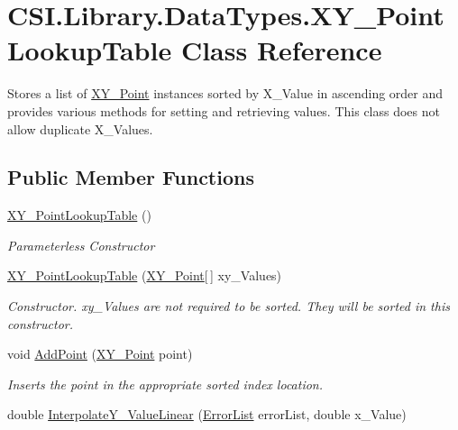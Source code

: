 \hypertarget{class_c_s_i_1_1_library_1_1_data_types_1_1_x_y___point_lookup_table}{}\section{C\+S\+I.\+Library.\+Data\+Types.\+X\+Y\+\_\+\+Point\+Lookup\+Table Class Reference}
\label{class_c_s_i_1_1_library_1_1_data_types_1_1_x_y___point_lookup_table}


Stores a list of \mbox{\hyperlink{struct_c_s_i_1_1_library_1_1_data_types_1_1_x_y___point}{X\+Y\+\_\+\+Point}} instances sorted by X\+\_\+\+Value in ascending order and provides various methods for setting and retrieving values. This class does not allow duplicate X\+\_\+\+Values.  


\subsection*{Public Member Functions}
\begin{DoxyCompactItemize}
\item 
\mbox{\hyperlink{class_c_s_i_1_1_library_1_1_data_types_1_1_x_y___point_lookup_table_a3cb5167efae35b3817028ee668aafa58}{X\+Y\+\_\+\+Point\+Lookup\+Table}} ()
\begin{DoxyCompactList}\small\item\em Parameterless Constructor \end{DoxyCompactList}\item 
\mbox{\hyperlink{class_c_s_i_1_1_library_1_1_data_types_1_1_x_y___point_lookup_table_aeac36bfc5b7f8b0a6fcb593a94536f2e}{X\+Y\+\_\+\+Point\+Lookup\+Table}} (\mbox{\hyperlink{struct_c_s_i_1_1_library_1_1_data_types_1_1_x_y___point}{X\+Y\+\_\+\+Point}}\mbox{[}$\,$\mbox{]} xy\+\_\+\+Values)
\begin{DoxyCompactList}\small\item\em Constructor. xy\+\_\+\+Values are not required to be sorted. They will be sorted in this constructor. \end{DoxyCompactList}\item 
void \mbox{\hyperlink{class_c_s_i_1_1_library_1_1_data_types_1_1_x_y___point_lookup_table_a5035954b59020011337bf06780fc5208}{Add\+Point}} (\mbox{\hyperlink{struct_c_s_i_1_1_library_1_1_data_types_1_1_x_y___point}{X\+Y\+\_\+\+Point}} point)
\begin{DoxyCompactList}\small\item\em Inserts the point in the appropriate sorted index location. \end{DoxyCompactList}\item 
double \mbox{\hyperlink{class_c_s_i_1_1_library_1_1_data_types_1_1_x_y___point_lookup_table_ae69e05b3b4e2125cb88d8c23f863b5e1}{Interpolate\+Y\+\_\+\+Value\+Linear}} (\mbox{\hyperlink{class_c_s_i_1_1_library_1_1_errors_1_1_error_list}{Error\+List}} error\+List, double x\+\_\+\+Value)
\end{DoxyCompactItemize}
